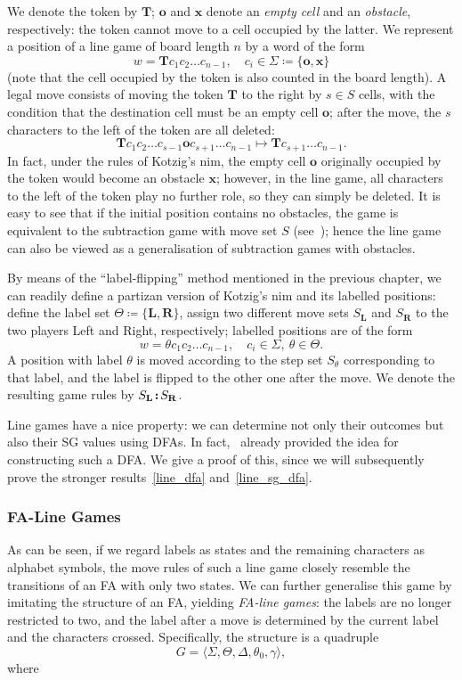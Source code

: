 \documentclass[11pt]{article}
\theoremstyle{definition}
\theoremstyle{plain}
\newcommand{\rmL}{\mathbf{L}}
\newcommand{\rmR}{\mathbf{R}}
\newcommand{\x}{\mathbf{x}}
\newcommand{\e}{\mathbf{o}}
\newcommand{\m}{\mathbf{T}}
\newcommand{\col}{\textbf{\;\!:\!\;}}
\begin{document}
We denote the token by $\m$; $\e$ and $\x$ denote an \textit{empty cell} and an \textit{obstacle}, respectively: the token cannot move to a cell occupied by the latter.
We represent a position of a line game of board length $n$ by a word of the form
\[
    w = \m c_1 c_2 \ldots c_{n-1},\quad c_i \in \varSigma \coloneq \{\e, \x\}
\]
(note that the cell occupied by the token is also counted in the board length).
A legal move consists of moving the token $\m$ to the right by $s\in S$ cells, with the condition that the destination cell must be an empty cell $\e$; after the move, the $s$ characters to the left of the token are all deleted:
\[
    \m c_1 c_2 \ldots c_{s-1} \e c_{s+1} \ldots  c_{n-1}  \mapsto \m c_{s+1} \ldots c_{n-1}.
\]
In fact, under the rules of Kotzig's nim, the empty cell $\e$ originally occupied by the token would become an obstacle $\x$;
however, in the line game, all characters to the left of the token play no further role, so they can simply be deleted.
It is easy to see that if the initial position contains no obstacles, the game is equivalent to the subtraction game with move set $S$ (see~\cite{subs_game}); hence the line game can also be viewed as a generalisation of subtraction games with obstacles.

By means of the ``label-flipping'' method mentioned in the previous chapter, we can readily define a partizan version of Kotzig's nim and its labelled positions:
define the label set $\varTheta\coloneq \{\rmL, \rmR\}$,
assign two different move sets $S_\rmL$ and $S_\rmR$ to the two players Left and Right, respectively; labelled positions are of the form
\[
    w = \theta c_1 c_2 \ldots c_{n-1},\quad c_i \in \varSigma,\ \theta \in\varTheta.
\]
A position with label $\theta$ is moved according to the step set $S_\theta$ corresponding to that label, and the label is flipped to the other one after the move.
We denote the resulting game rules by $S_\rmL \col S_\rmR$.

Line games have a nice property: we can determine not only their outcomes but also their SG values using DFAs.
In fact,~\cite{Kotzig2019} already provided the idea for constructing such a DFA.
We give a proof of this, since we will subsequently prove the stronger results~\ref{line_dfa} and~\ref{line_sg_dfa}.

\subsubsection{FA-Line Games}

As can be seen, if we regard labels as states and the remaining characters as alphabet symbols, the move rules of such a line game closely resemble the transitions of an FA with only two states.
We can further generalise this game by imitating the structure of an FA, yielding \textit{FA-line games}: the labels are no longer restricted to two, and the label after a move is determined by the current label and the characters crossed.
Specifically, the structure is a quadruple
\[
    G= \langle \varSigma, \varTheta, \varDelta, \theta_0, \gamma\rangle,
\]
where
\end{document}
